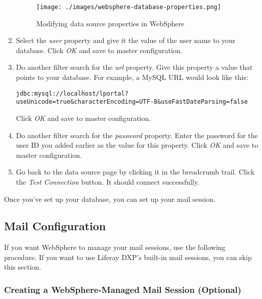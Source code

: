 \begin{enumerate}
  \begin{figure}
  \centering
  \texttt{[image: ./images/websphere-database-properties.png]}
  \caption{Modifying data source properties in WebSphere}
  \end{figure}
\item
  Select the \emph{user} property and give it the value of the user name
  to your database. Click \emph{OK} and save to master configuration.
\item
  Do another filter search for the \emph{url} property. Give this
  property a value that points to your database. For example, a MySQL
  URL would look like this:

\begin{verbatim}
jdbc:mysql://localhost/lportal?useUnicode=true&characterEncoding=UTF-8&useFastDateParsing=false
\end{verbatim}

  Click \emph{OK} and save to master configuration.
\item
  Do another filter search for the \emph{password} property. Enter the
  password for the user ID you added earlier as the value for this
  property. Click \emph{OK} and save to master configuration.
\item
  Go back to the data source page by clicking it in the breadcrumb
  trail. Click the \emph{Test Connection} button. It should connect
  successfully.
\end{enumerate}

Once you've set up your database, you can set up your mail session.

\subsection{Mail Configuration}\label{mail-configuration-5}

If you want WebSphere to manage your mail sessions, use the following
procedure. If you want to use Liferay DXP's built-in mail sessions, you
can skip this section.

\subsubsection{Creating a WebSphere-Managed Mail Session
(Optional)}\label{creating-a-websphere-managed-mail-session-optional}

